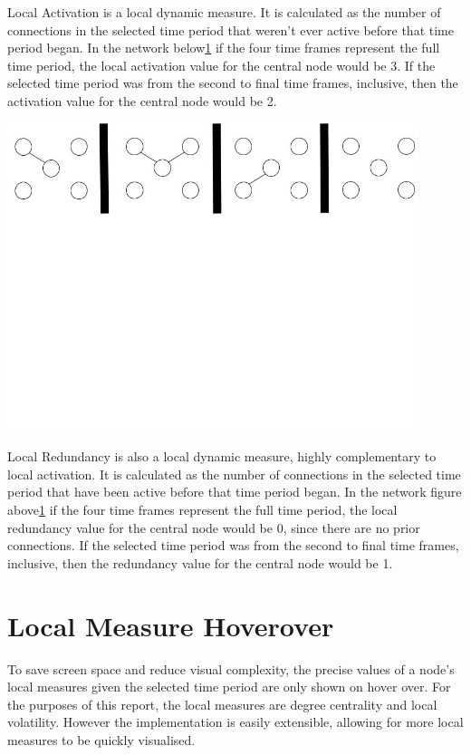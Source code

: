 Local Activation is a local dynamic measure. It is calculated as the number of connections in the selected time period that weren't ever active before that time period began. In the network below\ref{} if the four time frames represent the full time period, the local activation value for the central node would be 3. If the selected time period was from the second to final time frames, inclusive, then the activation value for the central node would be 2.
\begin{center}
\includegraphics[trim={0 10cm 0 -1cm}, width=120mm]{./Figures/localActivation1.jpg}
\end{center}

Local Redundancy is also a local dynamic measure, highly complementary to local activation. It is calculated as the number of connections in the selected time period that have been active before that time period began. In the network figure above\ref{} if the four time frames represent the full time period, the local redundancy value for the central node would be 0, since there are no prior connections. If the selected time period was from the second to final time frames, inclusive, then the redundancy value for the central node would be 1.



\section{Local Measure Hoverover}
To save screen space and reduce visual complexity, the precise values of a node's local measures given the selected time period are only shown on hover over. For the purposes of this report, the local measures are degree centrality and local volatility. However the implementation is easily extensible, allowing for more local measures to be quickly visualised.

